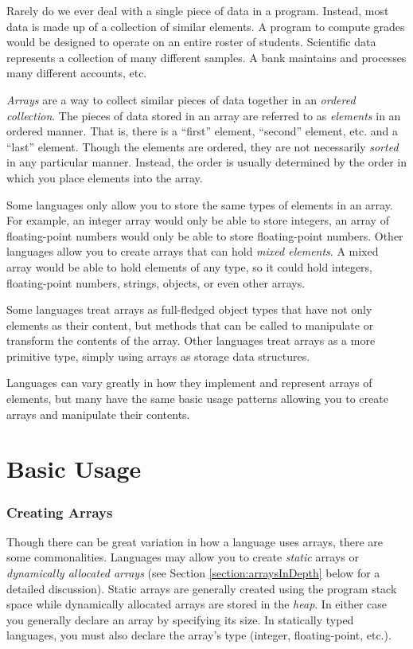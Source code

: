 

Rarely do we ever deal with a single piece of data in a program.  Instead, 
most data is made up of a collection of similar elements.  A program to
compute grades would be designed to operate on an entire roster of 
students.  Scientific data represents a collection of many different samples.
A bank maintains and processes many different accounts, etc.

\emph{Arrays} are a way to collect similar pieces of data together in an
\emph{ordered collection}.  The pieces of data stored in an array are
referred to as \emph{elements} in an ordered manner.  That is, there is 
a ``first'' element, ``second'' element, etc. and a ``last'' element.  Though
the elements are ordered, they are not necessarily \emph{sorted} in any 
particular manner.  Instead, the order is usually determined by the order
in which you place elements into the array.

Some languages only allow you to store the same types of elements in
an array.  For example, an integer array would only be able to store integers, 
an array of floating-point numbers would only be able to store floating-point
numbers.  Other languages allow you to create arrays that can hold 
\emph{mixed elements}.  A mixed array would be able to hold elements
of any type, so it could hold integers, floating-point numbers, strings, objects, 
or even other arrays.

Some languages treat arrays as full-fledged object types that have 
not only elements as their content, but methods that can be called
to manipulate or transform the contents of the array.  Other languages
treat arrays as a more primitive type, simply using arrays as storage
data structures.

Languages can vary greatly in how they implement and represent
arrays of elements, but many have the same basic usage patterns
allowing you to create arrays and manipulate their contents.

\section{Basic Usage}

\subsubsection{Creating Arrays}

Though there can be great variation in how a language uses arrays,
there are some commonalities.  Languages may allow you to create
\emph{static} arrays or \emph{dynamically allocated arrays} (see
Section \ref{section:arraysInDepth} below for a detailed discussion).  Static
arrays are generally created using the program stack space while 
dynamically allocated arrays are stored in the \emph{heap}.  In either
case you generally declare an array by specifying its size.  In statically
typed languages, you must also declare the array's type (integer, 
floating-point, etc.).

